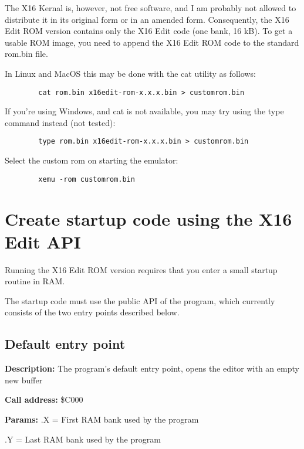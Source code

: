\documentclass{article}
\begin{document}
    The X16 Kernal is, however, not free software, and I am probably not allowed to distribute it in its
    original form or in an amended form. Consequently, the X16 Edit ROM version contains only the X16 Edit code (one bank, 16 kB). To get a 
    usable ROM image, you need to append the X16 Edit ROM code to the standard
    rom.bin file.

    In Linux and MacOS this may be done with the cat utility as follows: 
    
    \begin{verbatim}
        cat rom.bin x16edit-rom-x.x.x.bin > customrom.bin
    \end{verbatim}

    If you're using Windows, and cat is not available, you may try using the type command instead (not tested):
    
    \begin{verbatim}
        type rom.bin x16edit-rom-x.x.x.bin > customrom.bin
    \end{verbatim}

    Select the custom rom on starting the emulator: 
    
    \begin{verbatim}
        xemu -rom customrom.bin
    \end{verbatim}

\section{Create startup code using the X16 Edit API}

    Running the X16 Edit ROM version requires that you enter a small startup
    routine in RAM.

    The startup code must use the public API of the program, which currently
    consists of the two entry points described below.

    \subsection{Default entry point}

        \begin{hangparas}{3cm}{1}

            \textbf{Description:} \tabto{3cm} The program's default entry point, opens the editor with an empty new buffer

            \textbf{Call address:} \tabto{3cm}\$C000

            \textbf{Params:} \tabto{3cm}.X = First RAM bank used by the program
        
            \tabto{3cm}.Y = Last RAM bank used by the program

        \end{hangparas}
\end{document}
